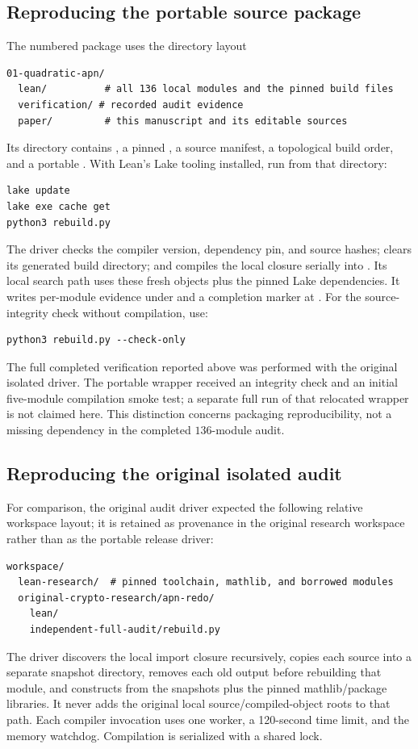 \subsection{Reproducing the portable source package}
The numbered package uses the directory layout
\begin{lstlisting}
01-quadratic-apn/
  lean/          # all 136 local modules and the pinned build files
  verification/ # recorded audit evidence
  paper/         # this manuscript and its editable sources
\end{lstlisting}
Its  directory contains , a pinned , a source manifest, a topological build order, and a portable . With Lean's Lake tooling installed, run from that directory:
\begin{lstlisting}
lake update
lake exe cache get
python3 rebuild.py
\end{lstlisting}
The driver checks the compiler version, dependency pin, and source hashes; clears its generated build directory; and compiles the local closure serially into . Its local search path uses these fresh objects plus the pinned Lake dependencies. It writes per-module evidence under  and a completion marker at . For the source-integrity check without compilation, use:
\begin{lstlisting}
python3 rebuild.py --check-only
\end{lstlisting}
The full completed verification reported above was performed with the original isolated driver. The portable wrapper received an integrity check and an initial five-module compilation smoke test; a separate full run of that relocated wrapper is not claimed here. This distinction concerns packaging reproducibility, not a missing dependency in the completed $136$-module audit.

\subsection{Reproducing the original isolated audit}
For comparison, the original audit driver expected the following relative workspace layout; it is retained as provenance in the original research workspace rather than as the portable release driver:
\begin{lstlisting}
workspace/
  lean-research/  # pinned toolchain, mathlib, and borrowed modules
  original-crypto-research/apn-redo/
    lean/
    independent-full-audit/rebuild.py
\end{lstlisting}
The driver discovers the local import closure recursively, copies each source into a separate snapshot directory, removes each old output before rebuilding that module, and constructs  from the snapshots plus the pinned mathlib/package libraries. It never adds the original local source/compiled-object roots to that path. Each compiler invocation uses one worker, a 120-second time limit, and the memory watchdog. Compilation is serialized with a shared lock.

